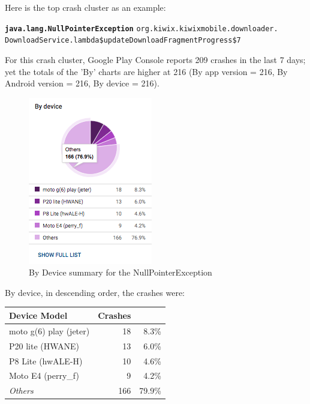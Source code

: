 Here is the top crash cluster as an example:

\small{
\textbf{\texttt{java.lang.NullPointerException}}
\texttt{org.kiwix.kiwixmobile.downloader. \\ DownloadService.lambda\$updateDownloadFragmentProgress\$7}}
\normalsize

For this crash cluster, Google Play Console reports 209 crashes in the last 7 days; yet the totals of the 'By' charts are higher at 216 (By app version = 216, By Android version = 216, By device = 216). 

\begin{figure}
    \centering
    \includegraphics{images/ByDeviceNPE.png}
    \caption{By Device summary for the NullPointerException}
    \label{fig:device_summary_for_NPE}
\end{figure}
By device, in descending order, the crashes were:
\begin{center}
\begin{tabular}{l|r|r}
Device Model                    & Crashes & \\
\hline
moto g(6) play (jeter)	        & 18	& 8.3\% \\
P20 lite (HWANE)	            & 13	& 6.0\% \\
P8 Lite (hwALE-H)	            & 10	& 4.6\% \\
Moto E4 (perry\_f)	            & 9	    & 4.2\% \\
\textit{Others}\footnotemark    & 166 & 79.9\%  \\
\end{tabular}
\end{center}

